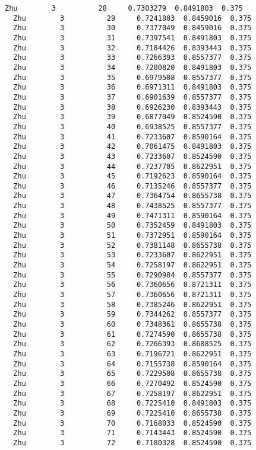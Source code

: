 \documentclass[11pt]{article}
\begin{document}
\begin{Verbatim}[commandchars=\\\{\}]
  Zhu        3          28     0.7303279  0.8491803  0.375
  Zhu        3          29     0.7241803  0.8459016  0.375
  Zhu        3          30     0.7377049  0.8459016  0.375
  Zhu        3          31     0.7397541  0.8491803  0.375
  Zhu        3          32     0.7184426  0.8393443  0.375
  Zhu        3          33     0.7266393  0.8557377  0.375
  Zhu        3          34     0.7200820  0.8491803  0.375
  Zhu        3          35     0.6979508  0.8557377  0.375
  Zhu        3          36     0.6971311  0.8491803  0.375
  Zhu        3          37     0.6901639  0.8557377  0.375
  Zhu        3          38     0.6926230  0.8393443  0.375
  Zhu        3          39     0.6877049  0.8524590  0.375
  Zhu        3          40     0.6938525  0.8557377  0.375
  Zhu        3          41     0.7233607  0.8590164  0.375
  Zhu        3          42     0.7061475  0.8491803  0.375
  Zhu        3          43     0.7233607  0.8524590  0.375
  Zhu        3          44     0.7237705  0.8622951  0.375
  Zhu        3          45     0.7192623  0.8590164  0.375
  Zhu        3          46     0.7135246  0.8557377  0.375
  Zhu        3          47     0.7364754  0.8655738  0.375
  Zhu        3          48     0.7438525  0.8557377  0.375
  Zhu        3          49     0.7471311  0.8590164  0.375
  Zhu        3          50     0.7352459  0.8491803  0.375
  Zhu        3          51     0.7372951  0.8590164  0.375
  Zhu        3          52     0.7381148  0.8655738  0.375
  Zhu        3          53     0.7233607  0.8622951  0.375
  Zhu        3          54     0.7258197  0.8622951  0.375
  Zhu        3          55     0.7290984  0.8557377  0.375
  Zhu        3          56     0.7360656  0.8721311  0.375
  Zhu        3          57     0.7360656  0.8721311  0.375
  Zhu        3          58     0.7385246  0.8622951  0.375
  Zhu        3          59     0.7344262  0.8557377  0.375
  Zhu        3          60     0.7348361  0.8655738  0.375
  Zhu        3          61     0.7274590  0.8655738  0.375
  Zhu        3          62     0.7266393  0.8688525  0.375
  Zhu        3          63     0.7196721  0.8622951  0.375
  Zhu        3          64     0.7155738  0.8590164  0.375
  Zhu        3          65     0.7229508  0.8655738  0.375
  Zhu        3          66     0.7270492  0.8524590  0.375
  Zhu        3          67     0.7258197  0.8622951  0.375
  Zhu        3          68     0.7225410  0.8491803  0.375
  Zhu        3          69     0.7225410  0.8655738  0.375
  Zhu        3          70     0.7168033  0.8524590  0.375
  Zhu        3          71     0.7143443  0.8524590  0.375
  Zhu        3          72     0.7180328  0.8524590  0.375

\end{Verbatim}
\end{document}
